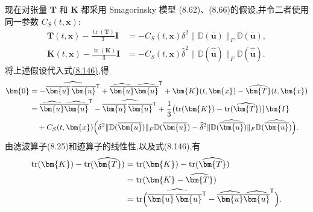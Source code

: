 \begin{note}[动态 Smagorinsky 模型]
现在对张量 $\bm{T}$ 和 $\bm{K}$ 都采用 Smagorinsky 模型
(8.62)、(8.66)的假设,并令二者使用同一参数 $C_S(t,\bm{x})$:
\[
\begin{aligned}
\bm{T}(t,\bm{x})
 -\frac{\operatorname{tr}(\bm{T})}{3}\bm{I}
 &=-C_S(t,\bm{x})\delta^2
   \|\mathbb{D}(\overline{\bm{u}})\|_F
   \mathbb{D}(\overline{\bm{u}}),\\
\bm{K}(t,\bm{x})
 -\frac{\operatorname{tr}(\bm{K})}{3}\bm{I}
 &=-C_S(t,\bm{x})\widehat\delta^2
   \|\mathbb{D}(\widehat{\overline{\bm{u}}})\|_F
   \mathbb{D}(\widehat{\overline{\bm{u}}}).
\end{aligned}
\]
将上述假设代入式\hyperref[eq:dynamic-smagorinsky-test-filter-identity]{(8.146)},得
\begin{equation}\label{eq:dynamic-smagorinsky-model-identity}
\begin{aligned}
\bm{0}
&=-\widehat{\overline{\bm{u}}\,\overline{\bm{u}}^{\mathsf T}}
  +\widehat{\overline{\bm{u}}}
   \widehat{\overline{\bm{u}}}^{\mathsf T}
  +\bm{K}(t,\bm{x})-\widehat{\bm{T}}(t,\bm{x})\\
&=\widehat{\overline{\bm{u}}}
   \widehat{\overline{\bm{u}}}^{\mathsf T}
 -\widehat{\overline{\bm{u}}\,\overline{\bm{u}}^{\mathsf T}}
  +\frac13\bigl(\operatorname{tr}(\bm{K})
                -\operatorname{tr}(\widehat{\bm{T}})\bigr)\bm{I}\\
&\quad+C_S(t,\bm{x})\Bigl(
 \delta^2\|\mathbb{D}(\overline{\bm{u}})\|_F
          \mathbb{D}(\overline{\bm{u}})
 -\widehat\delta^2
   \|\mathbb{D}(\widehat{\overline{\bm{u}}})\|_F
   \mathbb{D}(\widehat{\overline{\bm{u}}})\Bigr).
\end{aligned}
\end{equation}
由滤波算子(8.25)和迹算子的线性性,以及式(8.146),有
\begin{equation}\label{eq:dynamic-smagorinsky-trace-identity}
\begin{aligned}
\operatorname{tr}(\bm{K})-\operatorname{tr}(\widehat{\bm{T}})
&=\operatorname{tr}(\bm{K})
 -\operatorname{tr}(\widehat{\bm{T}})\\
&=\operatorname{tr}(\bm{K}-\widehat{\bm{T}})\\
&=\operatorname{tr}\Bigl(
 \widehat{\overline{\bm{u}}\,\overline{\bm{u}}^{\mathsf T}}
 -\widehat{\overline{\bm{u}}}
  \widehat{\overline{\bm{u}}}^{\mathsf T}\Bigr).
\end{aligned}
\end{equation}


\end{note}
